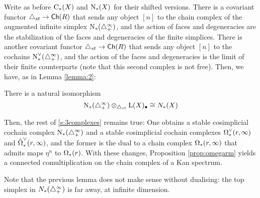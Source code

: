 Write as before $\operatorname{C}_{*}(X)$ and $\operatorname{N}_{*}(X)$ for their shifted versions. There is a covariant functor $\triangle_{st}\to \mathsf{Ch}(R)$ that sends any object $[n]$ to the chain complex of the augmented infinite simplex $\operatorname{N}_{*}(\triangle_{+}^\infty)$, and the action of faces and degeneracies are the stabilization of the faces and degeneracies of the finite simplices. There is another covariant functor $\triangle_{st}\to \mathsf{Ch}(R)$ that sends any object $[n]$ to the cochains $\operatorname{N}^\vee_{*}(\triangle_{+}^\infty)$, and the action of the faces and degeneracies is the limit of their finite counterparts (note that this second complex is not free). Then, we have, as in Lemma \ref{lemma:2}:

\begin{lemma}
    There is a natural isomorphism
\[
    \operatorname{N}_{*}(\triangle_{+}^{\infty}) \otimes _{\triangle_{st}} \operatorname{L}(X)_\bullet \cong N_{*}(X)
\]
\end{lemma}

Then, the rest of \cref{s:3complexes} remains true: One obtains a stable cosimplicial cochain complex $\operatorname{N}_{*}(\triangle_{+}^\infty)$ and a stable cosimplicial cochain complexes $\operatorname{\Omega}^{\vee}_{*}(r,\infty)$ and $\hat{\operatorname{\Omega}}^{\vee}_{*}(r,\infty)$, and the former is the dual to a chain complex $\operatorname{\Omega}_{*}(r,\infty)$ that admits maps $\eta^{n}$ to $\operatorname{\Omega}_{*}(r)$. With these changes, Proposition \ref{prop:omegarm} yields a connected comultiplication on the chain complex of a Kan spectrum.

Note that the previous lemma does not make sense without dualising: the top simplex in $N_*(\triangle_{+}^\infty)$ is far away, at infinite dimension.


